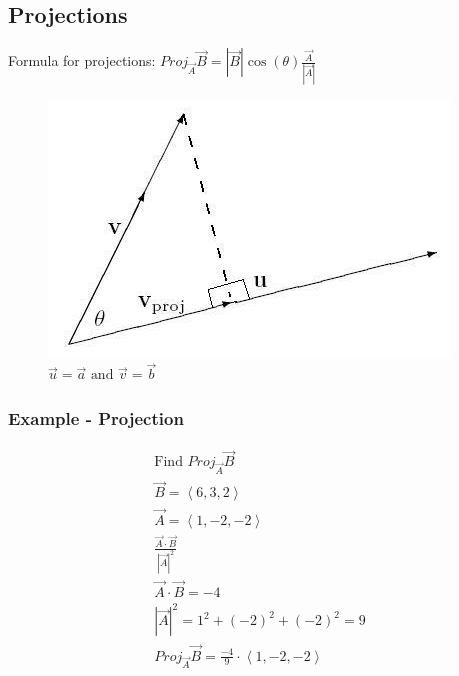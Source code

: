 \documentclass{article}
\newcommand{\nvec}[1]{\left\langle #1 \right\rangle}
\begin{document}
    \subsection{Projections}
    Formula for projections: $Proj_{\vec{A} }\vec{B}=|\vec{B}|\cos(\theta)\frac{\vec{A} }{|\vec{A}|}$
    \begin{figure}[ht]
        \centering
        \includegraphics[scale=.5]{projection.JPG}
        \caption{$\vec{u}=\vec{a} \text{ and } \vec{v}=\vec{b}$}
    \end{figure}

        \subsubsection{Example - Projection}
        \[
        \begin{aligned}
        \text{Find }Proj_{\vec{A} } \vec{B}\\
        \vec{B} = \nvec{6,3,2}\\
        \vec{A} = \nvec{1,-2,-2}\\
        \frac{\vec{A} \cdot \vec{B} }{ {|\vec{A}|^2} }\\
        \vec{A} \cdot \vec{B} = -4\\
        |\vec{A}|^2 = 1^2 + (-2)^2 + (-2)^2 = 9\\
        Proj_{\vec{A} } \vec{B} = \frac{-4}{9} \cdot \nvec{1,-2,-2}\\
        \end{aligned}
        \]
\end{document}
